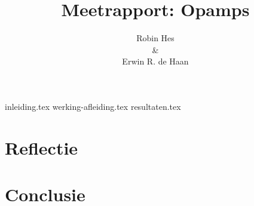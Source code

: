 \documentclass{report}
\title{Meetrapport: Opamps}
\author{Robin Hes\\\&\\Erwin R. de Haan}
\begin{document}
\maketitle
\tableofcontents

{inleiding.tex}
{werking-afleiding.tex}
{resultaten.tex}
\chapter{Reflectie}
\chapter{Conclusie}
\printbibliography
\end{document}
